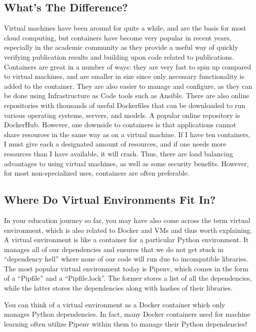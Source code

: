 {{{{{    \subsection{What’s The Difference?}
    
    Virtual machines have been around for quite a while, and are the basis for most cloud computing, but containers have become very popular in recent years, especially in the academic community as they provide a useful way of quickly verifying publication results and building upon code related to publications. Containers are great in a number of ways: they are very fast to spin up compared to virtual machines, and are smaller in size since only necessary functionality is added to the container. They are also easier to manage and configure, as they can be done using Infrastructure as Code tools such as Ansible. There are also online repositories with thousands of useful Dockerfiles that can be downloaded to run various operating systems, servers, and models. A popular online repository is DockerHub. However, one downside to containers is that applications cannot share resources in the same way as on a virtual machine. If I have ten containers, I must give each a designated amount of resources, and if one needs more resources than I have available, it will crash. Thus, there are load balancing advantages to using virtual machines, as well as some security benefits. However, for most non-specialized uses, containers are often preferable.
    
    \subsection{Where Do Virtual Environments Fit In?}
    
    In your education journey so far, you may have also come across the term virtual environment, which is also related to Docker and VMs and thus worth explaining. A virtual environment is like a container for a particular Python environment. It manages all of our dependencies and ensures that we do not get stuck in “dependency hell” where none of our code will run due to incompatible libraries. The most popular virtual environment today is Pipenv, which comes in the form of a “Pipfile” and a “Pipfile.lock”. The former stores a list of all the dependencies, while the latter stores the dependencies along with hashes of their libraries.
    
    You can think of a virtual environment as a Docker container which only manages Python dependencies. In fact, many Docker containers used for machine learning often utilize Pipenv within them to manage their Python dependencies!
    
}}}}}
